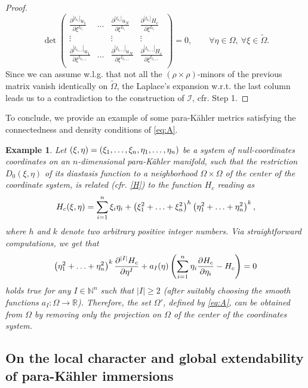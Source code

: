 \documentclass{article}
\newtheorem{ex}[thm]{Example}
\newcommand{\I}{\mathcal{I}}
\newcommand{\R}{\mathds{R}}
\newcommand{\de}{\partial}
\newcommand{\pk}{para-K\"ahler }
\newcommand{\N}{\mathds{N}}
\begin{document}
\begin{proof}
$$\det \begin{pmatrix}
\frac{\de^{| I_{k_1}| }u_1}{\de \xi^{I_{k_1}}}&\dots& \frac{\de^{| I_{k_1}| }u_N}{\de \xi^{I_{k_1}}}&\frac{\de^{|I_{k_1} | }H_c}{\de \xi^{I_{k_1}}}\\
\vdots & &\vdots&\vdots\\
\frac{\de^{|I_{k_{\rho+1}} | }u_1}{\de \xi^{I_{k_{\rho+1}}}}&\dots& \frac{\de^{|I_{k_{\rho+1}} | }u_N}{\de \xi^{I_{k_{\rho+1}}}}&\frac{\de^{| I_{k_{\rho+1}}| }H_c}{\de \xi^{I_{k_{\rho+1}}}}\\
\end{pmatrix}= 0,\qquad \forall \eta\in\Omega,\ \forall \xi\in\tilde \Omega.$$
Since we can assume w.l.g. that not all the $(\rho\times\rho)$-minors of the previous matrix vanish identically on $\tilde\Omega$, the Laplace's expansion w.r.t. the last column leads us to a contradiction to the construction of $\I$, cfr. Step 1.
\end{proof}


To conclude, we provide an example of some \pk metrics satisfying the  connectedness and density conditions of \eqref{eq:A}.
\begin{ex}
Let $(\xi,\eta)=(\xi_1,\mathellipsis ,\xi_n,\eta_1,\mathellipsis ,\eta_n)$ be a  system of null-coordinates coordinates on an $n$-dimensional \pk manifold, such that the restriction $D_0(\xi,\eta)$ of its diastasis function to a  neighborhood $\Omega\times \Omega$ of the center of the coordinate system, is related (cfr. \eqref{H}) to the function $H_c$ reading as
$$H_c(\xi,\eta)=\sum_{i=1}^n\xi_i\eta_i+\left(\xi_1^2+\mathellipsis+\xi_n^2\right)^h\left(\eta_1^2+\mathellipsis+\eta_n^2\right)^k,$$
where $h$ and $k$ denote two arbitrary positive integer numbers. Via straightforward computations, we get that
$$\left(\eta_1^2+\mathellipsis+\eta_n^2\right)^k \frac{\de^{|I|}H_c}{\de \eta^I}+ a_I(\eta) \left( \sum_{i=1}^n \eta_i \frac{\de H_c}{\de \eta_i}-H_c\right)=0$$
holds true for any $I\in\N^n$ such that $|I|\geq 2$ (after suitably choosing the smooth functions $a_I:\Omega\to\R$). Therefore, the set $\Omega'$, defined by \eqref{eq:A}, can be obtained from $\Omega$ by removing only the projection on $\Omega$ of the center of the coordinates system.
\end{ex}


\subsection{On the local character and global extendability of \pk immersions}\label{counterex}
\end{document}

